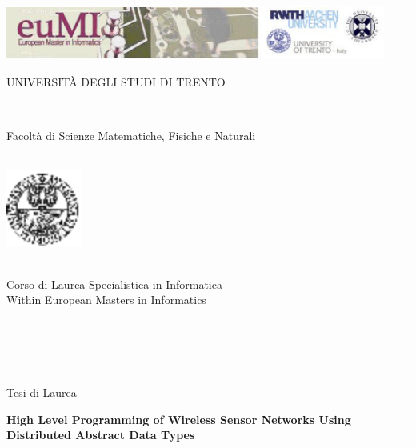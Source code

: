 \documentclass[msc, openright, a4paper]{TNthesis}
\author{Galiia Khasanova}
\begin{document}
 


\begin{preliminary}

\begin{titlepage}
	    \begin{center}
	    \vspace{-7.3cm}
	    \includegraphics[scale=.6,width=12.5cm]{img/logo_eumi.eps}\\
	 \vspace{0.3cm}
	        \begin{LARGE}
	        UNIVERSIT\`A DEGLI STUDI DI TRENTO
	        \end{LARGE}\\
	    \begin{large}
	        Facolt\`a di Scienze Matematiche, Fisiche e Naturali\\
	    \end{large}
	        \ \\
	    \vspace{0.5cm}
	    \includegraphics[width=2.5cm]{img/logo_unitn.eps}\\
	    \vspace{-0.3cm}
	    \begin{Large}
	        \ \\
	        Corso di Laurea Specialistica in Informatica\\
	        Within European Masters in Informatics
	        \end{Large}
	        \ \\
	        \hrule
	        \ \\
	        \begin{Large}
	        Tesi di Laurea\\
	        \end{Large}
	        \vspace{1.0cm}
	    \begin{center}
	    \begin{LARGE}
	        \textbf{High Level Programming of Wireless Sensor Networks Using Distributed Abstract Data Types}\\
	        \end{LARGE}
	    \end{center}
	

\end{center}
\end{titlepage}
\end{preliminary}
\end{document}

